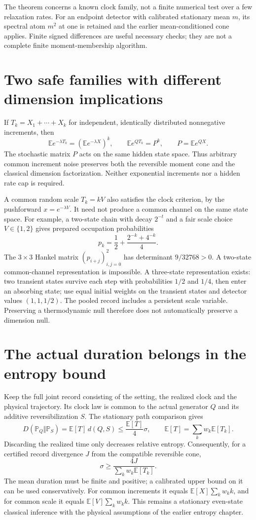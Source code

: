 The theorem concerns a known clock family, not a finite numerical test over a
few relaxation rates. For an endpoint detector with calibrated stationary mean
$m$, its spectral atom $m^2$ at one is retained and the earlier mean-conditioned
cone applies. Finite signed differences are useful necessary checks; they are
not a complete finite moment-membership algorithm.

\section{Two safe families with different dimension implications}
If $T_k=X_1+\cdots+X_k$ for independent, identically distributed nonnegative
increments, then
\[
 \mathbb E e^{-\lambda T_k}=\left(\mathbb E e^{-\lambda X}\right)^k,
 \qquad
 \mathbb E e^{QT_k}=P^k,
 \qquad P=\mathbb E e^{QX}.
\]
The stochastic matrix $P$ acts on the same hidden state space. Thus arbitrary
common increment noise preserves both the reversible moment cone and the
classical dimension factorization. Neither exponential increments nor a hidden
rate cap is required.

A common random scale $T_k=kV$ also satisfies the clock criterion, by the
pushforward $x=e^{-\lambda V}$. It need not produce a common channel on the
same state space. For example, a two-state chain with decay $2^{-t}$ and a fair
scale choice $V\in\{1,2\}$ gives prepared occupation probabilities
\[
 p_k=\frac12+\frac{2^{-k}+4^{-k}}4.
\]
The $3\times3$ Hankel matrix $(p_{i+j})_{i,j=0}^2$ has determinant
$9/32768>0$. A two-state common-channel representation is impossible. A
three-state representation exists: two transient states survive each step with
probabilities $1/2$ and $1/4$, then enter an absorbing state; use equal initial
weights on the transient states and detector values $(1,1,1/2)$.
The pooled record includes a persistent scale variable. Preserving a
thermodynamic null therefore does not automatically preserve a dimension null.

\section{The actual duration belongs in the entropy bound}
Keep the full joint record consisting of the setting, the realized clock and
the physical trajectory. Its clock law is common to the actual generator $Q$
and its additive reversibilization $S$. The stationary path comparison gives
\[
 D(\mathbb P_Q\Vert\mathbb P_S)
 =\mathbb E[T]\,d(Q,S)\leq\frac{\mathbb E[T]}4\sigma,
 \qquad
 \mathbb E[T]=\sum_k w_k\mathbb E[T_k].
\]
Discarding the realized time only decreases relative entropy. Consequently,
for a certified record divergence $J$ from the compatible reversible cone,
\begin{equation}
 \sigma\geq\frac{4J}{\sum_kw_k\mathbb E[T_k]}.
 \label{eq:random-clock-entropy}
\end{equation}
The mean duration must be finite and positive; a calibrated upper bound on it
can be used conservatively. For common increments it equals
$\mathbb E[X]\sum_kw_kk$, and for common scale it equals
$\mathbb E[V]\sum_kw_kk$. This remains a stationary even-state classical
inference with the physical assumptions of the earlier entropy chapter.

